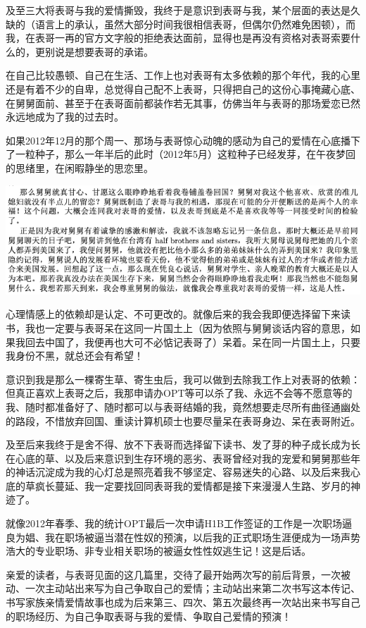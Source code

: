 \documentclass[9pt, b5paper]{article}
\begin{document}
及至三大将表哥与我的爱情撕毁，我终于是意识到表哥与我，某个层面的表达是久缺的（语言上的承认，虽然大部分时间我很相信表哥，但偶尔仍然难免困顿），而我，在表哥一再的官方文字般的拒绝表达面前，显得也是再没有资格对表哥索要什么的，更别说是想要表哥的承诺。

在自己比较愚顿、自己在生活、工作上也对表哥有太多依赖的那个年代，我的心里还是有着不少的自卑，总觉得自己配不上表哥，只得把自己的这份心事掩藏心底、在舅舅面前、甚至于在表哥面前都装作若无其事，仿佛当年与表哥的那场爱恋已然永远地成为了我的过去时。

如果2012年12月的那个周一、那场与表哥惊心动魄的感动为自己的爱情在心底播下了一粒种子，那么一年半后的此时（2012年5月）这粒种子已经发芽，在午夜梦回的思绪里，在闲暇静坐的思恋里。

\begin{center}
\includegraphics[width=.9\linewidth]{./pic/p1p138-1.png}
\end{center}

心理情感上的依赖却是认定、不可更改的。就像后来的我会我即便选择留下来读书，我也一定要与表哥呆在这同一片国土上（因为依照与舅舅谈话内容的意思，如果我回去中国了，我便再也大可不必惦记表哥了）呆着。呆在同一片国土上，只要我身份不黑，就总还会有希望！

意识到我是那么一棵寄生草、寄生虫后，我可以做到去除我工作上对表哥的依赖：但真正喜欢上表哥之后，我那申请办OPT等可以杀了我、永远不会等不愿意等的我、随时都准备好了、随时都可以与表哥结婚的我，竟然想要走尽所有曲径通幽处的路段，不惜放弃回国、重读计算机硕士也要尽量呆在表哥身边、呆在表哥附近。 

及至后来我终于是舍不得、放不下表哥而选择留下读书、发了芽的种子成长成为长在心底的草、以及后来意识到生存环境的恶劣、表哥曾经对我的宠爱和舅舅那些年的神话沉淀成为我的心灯总是照亮着我不够坚定、容易迷失的心路、以及后来我心底的草疯长蔓延、我一定要找回同表哥我的爱情都是接下来漫漫人生路、岁月的神迹了。

就像2012年春季、我的统计OPT最后一次申请H1B工作签证的工作是一次职场逼良为娼、我在职场被逼当潜在性奴的预演，以后我的正式职场生涯便成为一场声势浩大的专业职场、非专业相关职场的被逼女性性奴逃生记！这是后话。

亲爱的读者，与表哥见面的这几篇里，交待了最开始两次写的前后背景，一次被动、一次主动站出来写为自己争取自己的爱情；主动站出来第二次书写这本传记、书写家族亲情爱情故事也成为后来第三、四次、第五次最终再一次站出来书写自己的职场经历、为自己争取表哥与我的爱情、争取自己爱情的预演！
\end{document}
